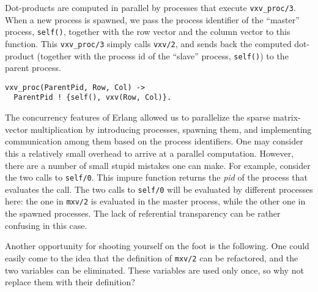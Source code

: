 Dot-products are computed in parallel by processes that execute
\lstinline[language=myerlang]{vxv_proc/3}. When a new process is spawned, we pass the process
identifier of the ``master'' process, \lstinline[language=myerlang]{self()}, together with the
row vector and the column vector to this function. This
\lstinline[language=myerlang]{vxv_proc/3} simply calls \lstinline[language=myerlang]{vxv/2}, and sends back the
computed dot-product (together with the process id of the ``slave''
process, \lstinline[language=myerlang]{self()}) to the parent process.

\begin{lstlisting}[language=myerlang]
vxv_proc(ParentPid, Row, Col) ->
  ParentPid ! {self(), vxv(Row, Col)}.
\end{lstlisting}


The concurrency features of Erlang allowed us to parallelize the sparse
matrix-vector multiplication by introducing processes, spawning them,
and implementing communication among them based on the process
identifiers. One may consider this a relatively small overhead to arrive
at a parallel computation. However, there are a number of
small stupid mistakes one can make.
For example, consider the two calls to
\lstinline[language=myerlang]{self/0}. This impure function returns the \emph{pid} of the
process that evaluates the call. The two calls to \lstinline[language=myerlang]{self/0} will
be evaluated by different processes here: the one in \lstinline[language=myerlang]{mxv/2} is
evaluated in the master process, while the other one in the spawned
processes. %
The lack of referential transparency can be rather confusing in this
case.

Another opportunity for shooting yourself on the foot is the following.
One could easily come to the idea that
the definition of \lstinline[language=myerlang]{mxv/2} can be refactored, and the two
variables can be eliminated. These variables are used only once, so why
not replace them with their definition?

